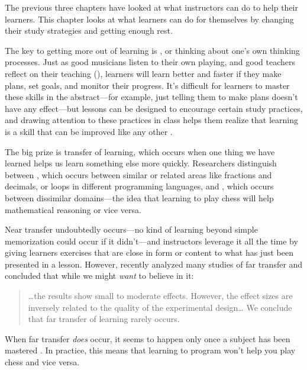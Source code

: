 
The previous three chapters have looked at what instructors can do to
help their learners. This chapter looks at what learners can do for
themselves by changing their study strategies and getting enough rest.

The key to getting more out of learning is
, or thinking about one's
own thinking processes. Just as good musicians listen to their own
playing, and good teachers reflect on their teaching
(), learners will learn better and faster if
they make plans, set goals, and monitor their progress. It's difficult
for learners to master these skills in the abstract---for example, just
telling them to make plans doesn't have any effect---but lessons can be
designed to encourage certain study practices, and drawing attention to
these practices in class helps them realize that learning is a skill
that can be improved like any other \cite{McGu2015,Miya2018}.

The big prize is transfer of learning, which occurs when one thing we
have learned helps us learn something else more quickly. Researchers
distinguish between , which occurs
between similar or related areas like fractions and decimals, or loops
in different programming languages, and , which occurs between dissimilar
domains---the idea that learning to play chess will help mathematical
reasoning or vice versa.

Near transfer undoubtedly occurs---no kind of learning beyond simple
memorization could occur if it didn't---and instructors leverage it all
the time by giving learners exercises that are close in form or content
to what has just been presented in a lesson. However, \cite{Sala2017}
recently analyzed many studies of far transfer and concluded that while
we might \emph{want} to believe in it:

\begin{quote}

{\ldots}the results show small to moderate effects. However, the
effect sizes are inversely related to the quality of the experimental
design{\ldots} We conclude that far transfer of learning rarely
occurs.

\end{quote}

When far transfer \emph{does} occur, it seems to happen only once a subject
has been mastered \cite{Gick1987}. In practice, this means that
learning to program won't help you play chess and vice versa.

